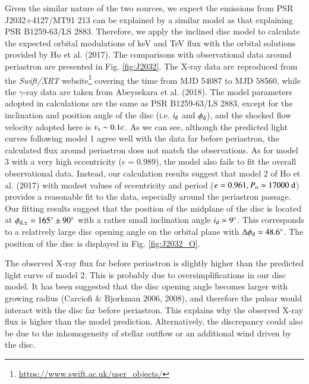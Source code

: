 \documentclass{aa}
\def\PSRB1259{PSR B1259-63/LS 2883}
\def\PSRJ2032{PSR J2032+4127/MT91 213}
\begin{document}
Given the similar nature of the two sources, we expect the emissions from \PSRJ2032 can be explained by a similar model as that explaining \PSRB1259. Therefore, we apply the inclined disc model to calculate the expected orbital modulations of keV and TeV flux with the orbital solutions provided by Ho et al. (2017). The comparisons with observational data around periastron are presented in Fig. \ref{fig:J2032}.
The X-ray data are reproduced from the \textit{Swift/XRT} website\footnote{\url{https://www.swift.ac.uk/user_objects/}} covering the time from MJD 54087 to MJD 58560, while the $\gamma$-ray data are taken from Abeysekara et al. (2018).
The model parameters adopted in calculations are the same as \PSRB1259, except for the inclination and position angle of the disc (i.e. $i_{\rm d}$ and $\phi_{\rm d}$), and the shocked flow velocity adopted here is $v_{\rm s}\sim 0.1c$.
As we can see, although the predicted light curves following model 1 agree well with the data far before periastron, the calculated flux around periastron does not match the observations. As for model 3 with a very high eccentricity ($e=0.989$), the model also fails to fit the overall observational data.
Instead, our calculation results suggest that model 2 of Ho et al. (2017) with modest values of eccentricity and period ($e=0.961, P_{\rm o}\simeq17000\ {\rm d}$) provides a reasonable fit to the data, especially around the periastron passage.
Our fitting results suggest that the position of the midplane of the disc is located at $\phi_{\rm d,\pm}=165^{\circ}\pm 90^{\circ}$ with a rather small inclination angle $i_{\rm d}\simeq 9^{\circ}$. This corresponds to a relatively large disc opening angle on the orbital plane with $\Delta\phi_{\rm d}\simeq 48.6^{\circ}$. The position of the disc is displayed in Fig. \ref{fig:J2032_O}.

The observed X-ray flux far before periastron is slightly higher than the predicted light curve of model 2. This is probably due to oversimplifications in our disc model.
It has been suggested that the disc opening angle becomes larger with growing radius (Carciofi \& Bjorkman 2006, 2008), and therefore the pulsar would interact with the disc far before periastron. This explains why the observed X-ray flux is higher than the model prediction.
Alternatively, the discrepancy could also be due to the inhomogeneity of stellar outflow or an additional wind driven by the disc.




\end{document}
